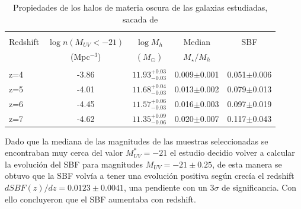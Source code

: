 \documentclass{article}
\begin{document}
\begin{table}[h]
\begin{center}
\begin{tabular}{lcccc}
\hline \hline\\
Redshift & $\log n(M_{UV}<-21)$ & $\log M_h$ & Median & SBF \\
	& (Mpc$^{-3}$)& $(M_\odot)$ &	$M_\star/M_h$	&	\\
\hline\\
z=4 & -3.86 & $11.93_{-0.03}^{+0.03}$ & 0.009$\pm$0.001 & 0.051$\pm$0.006\\
z=5 & -4.01 & $11.68_{-0.03}^{+0.04}$ & 0.013$\pm$0.002 & 0.079$\pm$0.013\\
z=6 & -4.45 & $11.57_{-0.03}^{+0.06}$ & 0.016$\pm$0.003 & 0.097$\pm$0.019\\
z=7 & -4.62 & $11.35_{-0.06}^{+0.09}$ & 0.020$\pm$0.007 & 0.117$\pm$0.043\\
\hline
\end{tabular}
\caption{\label{tab:finkelstein2} Propiedades de los halos de materia oscura de las galaxias estudiadas, sacada de \cite{finkelstein2015increasing}}
\end{center}
\end{table}

Dado que la mediana de las magnitudes de las muestras seleccionadas se encontraban muy cerca del valor $M_{UV}^*=-21$ el estudio decidio volver a calcular la evolución del SBF para magnitudes $M_{UV}=-21\pm 0.25$, de esta manera se obtuvo que la SBF volvía a tener una evolución positiva según crecía el redshift $d SBF(z)/dz=0.0123\pm 0.0041$, una pendiente con un $3\sigma$ de significancia. Con ello concluyeron que el SBF aumentaba con redshift.


\newpage





\end{document}
